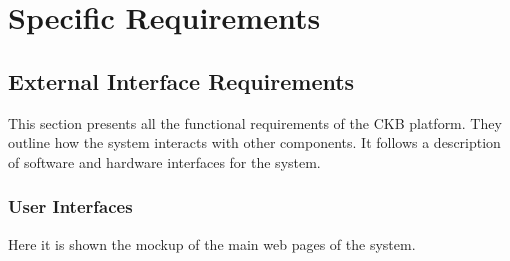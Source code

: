 \chapter{Specific Requirements}

\section{External Interface Requirements}
This section presents all the functional requirements of the CKB platform.
They outline how the system interacts with other components.
It follows a description of software and hardware interfaces for the system.

\subsection{User Interfaces}


Here it is shown the mockup of the main web pages of the system.
 
\captionsetup[figure]{skip=0pt}
